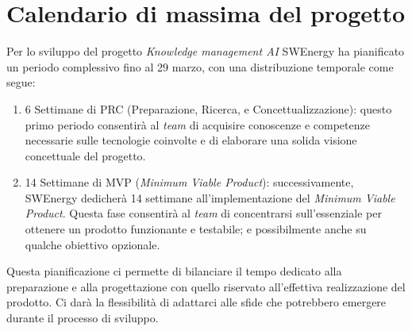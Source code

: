 \section{Calendario di massima del progetto}

Per lo sviluppo del progetto \textit{Knowledge management AI} SWEnergy ha 
pianificato un periodo complessivo fino al 29 marzo, con una distribuzione 
temporale come segue:

\begin{enumerate}
	\item 6 Settimane di PRC (Preparazione, Ricerca, e Concettualizzazione): 
	questo primo periodo consentirà al \textit{team} di acquisire conoscenze e 
	competenze necessarie sulle tecnologie coinvolte e di elaborare una solida 
	visione concettuale del progetto.

	\item 14 Settimane di MVP (\textit{Minimum Viable Product}): 
	successivamente, SWEnergy dedicherà 14 settimane all'implementazione del
	\textit{Minimum Viable Product}. Questa fase consentirà al \textit{team} di 
	concentrarsi sull'essenziale per ottenere un prodotto funzionante e 
	testabile; e possibilmente anche su qualche obiettivo opzionale.
\end{enumerate}

Questa pianificazione ci permette di bilanciare il tempo dedicato alla 
preparazione e alla progettazione con quello riservato all'effettiva 
realizzazione del prodotto. Ci darà la flessibilità di adattarci alle sfide che 
potrebbero emergere durante il processo di sviluppo.
